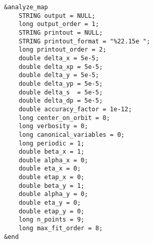 \documentclass[11pt]{article}
\begin{document}
\begin{verbatim}
&analyze_map
    STRING output = NULL;
    long output_order = 1;
    STRING printout = NULL;
    STRING printout_format = "%22.15e ";
    long printout_order = 2;
    double delta_x = 5e-5;
    double delta_xp = 5e-5;
    double delta_y = 5e-5;
    double delta_yp = 5e-5;
    double delta_s  = 5e-5;
    double delta_dp = 5e-5;
    double accuracy_factor = 1e-12;
    long center_on_orbit = 0;
    long verbosity = 0;
    long canonical_variables = 0;
    long periodic = 1;
    double beta_x = 1;
    double alpha_x = 0;
    double eta_x = 0;
    double etap_x = 0;
    double beta_y = 1;
    double alpha_y = 0;
    double eta_y = 0;
    double etap_y = 0;
    long n_points = 9;
    long max_fit_order = 8;
&end
\end{verbatim}
\end{document}

